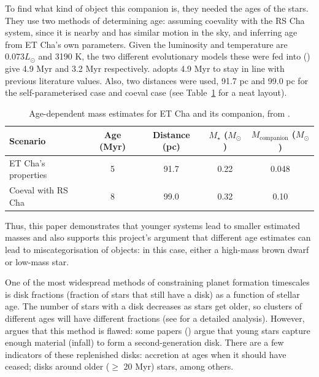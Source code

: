 \documentclass[11pt]{report}
\begin{document}
\begin{mainf}
To find what kind of object this companion is, they needed the ages of the stars. They use two methods of determining age: assuming coevality with the RS Cha system, since it is nearby and has similar motion in the sky, and inferring age from ET Cha's own parameters. 
Given the luminosity and temperature are $0.073 L_\odot$ and 3190 K, the two different evolutionary models these were fed into (\citealp{Siess2000, Baraffe2015}) give 4.9 Myr and 3.2 Myr respectively. \citet{Ginski2020} adopts 4.9 Myr to stay in line with previous literature values.
Also, two distances were used, 91.7 pc and 99.0 pc for the self-parameterised case and coeval case (see Table~\ref{tab:etcha} for a neat layout). 

\begin{table}[h]
\centering
\begin{singlespace}
\begin{tabular}{lcccc}
\toprule
Scenario & Age (Myr) & Distance (pc) & $M_\star$ ($M_\odot$) & $M_\mathrm{companion}$ ($M_\odot$) \\
\midrule
ET Cha's properties & 5 & 91.7 & 0.22 & 0.048 \\
Coeval with RS Cha        & 8 & 99.0 & 0.32 & 0.10 \\
\bottomrule
\end{tabular}
\caption{Age-dependent mass estimates for ET Cha and its companion, from \citet{Ginski2020}.}\label{tab:etcha}
\end{singlespace}
\end{table}

Thus, this paper demonstrates that younger systems lead to smaller estimated masses and also supports this project's argument that different age estimates can lead to miscategorisation of objects:
in this case, either a high-mass brown dwarf or low-mass star.

One of the most widespread methods of constraining planet formation timescales is disk fractions (fraction of stars that still have a disk) as a function of stellar age. 
The number of stars with a disk decreases as stars get older, so clusters of different ages will have different fractions (see \citet{Fedele2010} for a detailed analysis). However, \citet{Kuffmeier2026} argues that this method
is flawed: some papers (\citealp{Scicluna2014,Kuffmeier2020}) argue that young stars capture enough material (infall) to form a second-generation disk. There are a few indicators of these replenished disks: accretion at ages when it should have ceased; disks around older ($\geq$ 20 Myr) stars, among others.


\end{mainf}
\end{document}
